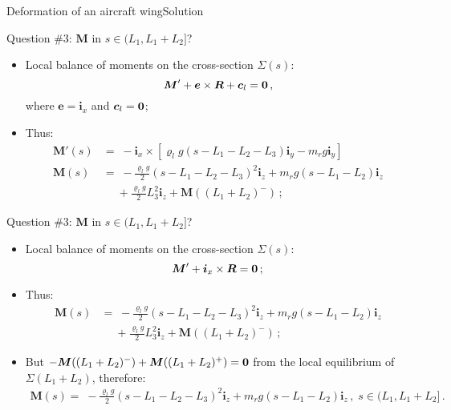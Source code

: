 \documentclass{beamer}
\newcommand{\cj}{c}
\newcommand{\cv}{{\boldsymbol\cj}}
\newcommand{\xj}{x}
\newcommand{\yj}{y}
\newcommand{\zj}{z}
\newcommand{\ej}{e}
\renewcommand{\ij}{i}
\newcommand{\ev}{{\boldsymbol\ej}}
\newcommand{\iv}{{\boldsymbol\ij}}
\newcommand{\roi}{\varrho}
\newcommand{\Fresj}{R}
\newcommand{\Mresj}{M}
\newcommand{\Fres}{{\boldsymbol\Fresj}}
\newcommand{\Mres}{{\boldsymbol\Mresj}}
\newcommand{\bzero}{{\bf 0}}
\begin{document}
\begin{frame}{Deformation of an aircraft wing}{Solution}
\begin{overprint}
\vskip-20pt
\begin{exampleblock}{Question \#3: $\Mres$ in $s\in(L_1,L_1+L_2]$?}
\begin{itemize}
\item Local balance of moments on the cross-section $\Sigma(s)$:
\begin{displaymath}
\Mres'+\ev\times\Fres+\cv_l=\bzero\,,
\end{displaymath}
where $\ev=\iv_\xj$ and $\cv_l=\bzero$;
\item Thus:
\begin{displaymath}
\begin{split}
\!\!\!\!\Mres'(s) &= \scriptstyle\; -\iv_\xj\times[\roi_l g(s-L_1-L_2-L_3)\iv_\yj-m_r g\iv_\yj] \\
\!\!\!\!\Mres(s) &= \scriptstyle\; -\frac{\roi_l g}{2}(s-L_1-L_2-L_3)^2\iv_\zj + m_r g(s-L_1-L_2)\iv_\zj \\
& \scriptstyle\;\quad+\frac{\roi_l g}{2}L_3^2\iv_\zj +\Mres((L_1+L_2)^-)\,;
\end{split}
\end{displaymath}
\end{itemize}
\end{exampleblock}

\vskip-20pt
\begin{exampleblock}{Question \#3: $\Mres$ in $s\in(L_1,L_1+L_2]$?}
\begin{itemize}
\item Local balance of moments on the cross-section $\Sigma(s)$:
\begin{displaymath}
\Mres'+\iv_\xj\times\Fres=\bzero\,;
\end{displaymath}
\item Thus:
\begin{displaymath}
\begin{split}
\!\!\!\!\Mres(s) &= \scriptstyle\; -\frac{\roi_l g}{2}(s-L_1-L_2-L_3)^2\iv_\zj + m_r g(s-L_1-L_2)\iv_\zj \\
& \scriptstyle\;\quad+\frac{\roi_l g}{2}L_3^2\iv_\zj +\Mres((L_1+L_2)^-)\,;
\end{split}
\end{displaymath}
\item But $-\Mres((L_1+L_2)^-)+\Mres((L_1+L_2)^+)=\bzero$ from the local equilibrium of $\Sigma(L_1+L_2)$, therefore:
\begin{multline*}
\!\!\!\!\!\!\!\!\!\!\!\!\Mres(s)= \scriptstyle\;-\frac{\roi_l g}{2}(s-L_1-L_2-L_3)^2\iv_\zj + m_r g(s-L_1-L_2)\iv_\zj \,,\; s\in(L_1,L_1+L_2]\,.
\end{multline*}
\end{itemize}
\end{exampleblock}


\end{overprint}
\end{frame}
\end{document}
